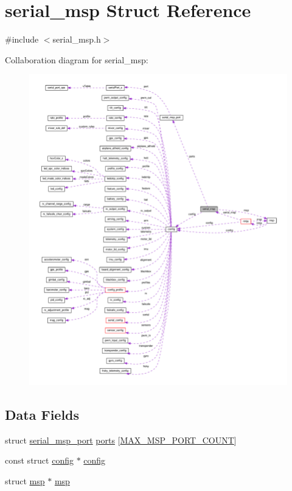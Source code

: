 \hypertarget{structserial__msp}{\section{serial\+\_\+msp Struct Reference}
\label{structserial__msp}
}


{\ttfamily \#include $<$serial\+\_\+msp.\+h$>$}



Collaboration diagram for serial\+\_\+msp\+:\nopagebreak
\begin{figure}[H]
\begin{center}
\leavevmode
\includegraphics[width=350pt]{structserial__msp__coll__graph}
\end{center}
\end{figure}
\subsection*{Data Fields}
\begin{DoxyCompactItemize}
\item 
struct \hyperlink{structserial__msp__port}{serial\+\_\+msp\+\_\+port} \hyperlink{structserial__msp_ae1f0b11113b9d5190cd1ae6c821d70e7}{ports} \mbox{[}\hyperlink{serial__msp_8h_ab55b5aff4ab16a071151e8854d6dfa8d}{M\+A\+X\+\_\+\+M\+S\+P\+\_\+\+P\+O\+R\+T\+\_\+\+C\+O\+U\+N\+T}\mbox{]}
\item 
const struct \hyperlink{structconfig}{config} $\ast$ \hyperlink{structserial__msp_ad95949b17128a580c07bb01648295787}{config}
\item 
struct \hyperlink{structmsp}{msp} $\ast$ \hyperlink{structserial__msp_a2a967344a1665d488e933d2f05e3978d}{msp}
\end{DoxyCompactItemize}


